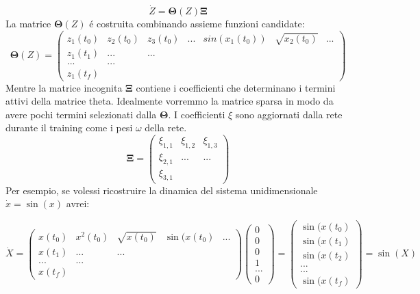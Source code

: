 \documentclass[11pt]{article}
\begin{document}
$$\dot{Z} = \mathbf{\Theta}(Z) \mathbf{\Xi}$$
La matrice $\mathbf{\Theta}(Z)$ é costruita combinando assieme funzioni candidate:
\begin{equation}
\mathbf{\Theta}(Z) =  
\begin{pmatrix}
z_1(t_0) & z_2(t_0) & z_3(t_0) & ... & sin(x_1(t_0)) & \sqrt{x_2(t_0)} & ... \\
z_1(t_1) & ... & ...  \\
 ... & ...   \\
z_1(t_f)
\end{pmatrix}
\end{equation}
Mentre la matrice incognita $\mathbf{\Xi}$ contiene i coefficienti che determinano i termini attivi della matrice theta. Idealmente vorremmo la matrice sparsa in modo da avere pochi termini selezionati dalla $\mathbf{\Theta}$.
I coefficienti $\xi$ sono aggiornati dalla rete durante il training come i pesi $\omega$ della rete.\\
\begin{equation}
\mathbf{\Xi} =  
\begin{pmatrix}
\xi_{1,1} & \xi_{1,2} & \xi_{1,3} \\ 
\xi_{2,1} & ... & ... \\
\xi_{3,1}
\end{pmatrix}
\end{equation}
Per esempio, se volessi ricostruire la dinamica del sistema unidimensionale $\dot{x} = \sin(x) $ avrei:

\begin{equation}
\dot{X} =  
\begin{pmatrix}
x(t_0) & x^2(t_0) & \sqrt{x(t_0)} & \sin(x(t_0) & ...  \\
x(t_1) & ... & ...  \\
 ... & ...   \\
x(t_f)
\end{pmatrix} 
\begin{pmatrix}
0 \\ 
0 \\
0 \\ 
1 \\ 
... \\
0
\end{pmatrix}
= 
\begin{pmatrix}
\sin(x(t_0) \\ 
\sin(x(t_1) \\
\sin(x(t_2) \\ 
... \\ 
... \\
\sin(x(t_f)
\end{pmatrix} 
= \sin(X)
\end{equation}
\end{document}
